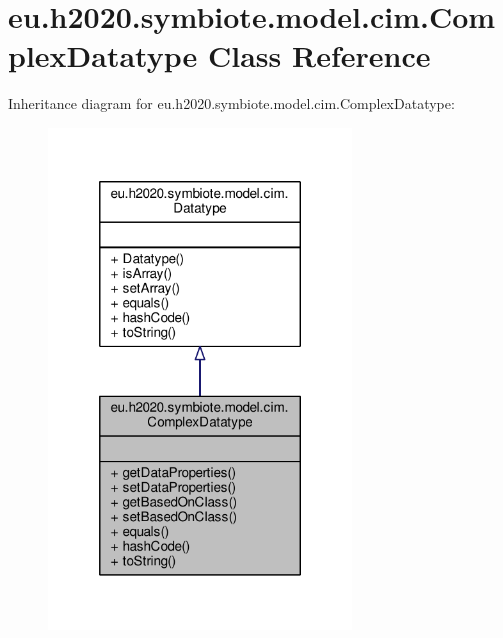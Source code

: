 \hypertarget{classeu_1_1h2020_1_1symbiote_1_1model_1_1cim_1_1ComplexDatatype}{}\section{eu.\+h2020.\+symbiote.\+model.\+cim.\+Complex\+Datatype Class Reference}
\label{classeu_1_1h2020_1_1symbiote_1_1model_1_1cim_1_1ComplexDatatype}


Inheritance diagram for eu.\+h2020.\+symbiote.\+model.\+cim.\+Complex\+Datatype\+:
\nopagebreak
\begin{figure}[H]
\begin{center}
\leavevmode
\includegraphics[width=228pt]{classeu_1_1h2020_1_1symbiote_1_1model_1_1cim_1_1ComplexDatatype__inherit__graph}
\end{center}
\end{figure}


